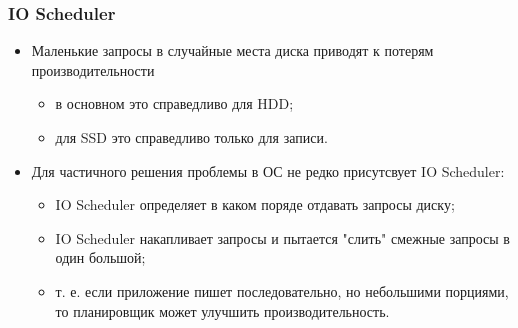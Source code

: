 \begin{frame}
\frametitle{IO Scheduler}
\begin{itemize}
  \item Маленькие запросы в случайные места диска приводят к потерям
  производительности
  \begin{itemize}
    \item в основном это справедливо для HDD;
    \item для SSD это справедливо только для записи.
  \end{itemize}
  \item Для частичного решения проблемы в ОС не редко присутсвует IO Scheduler:
  \begin{itemize}
    \item IO Scheduler определяет в каком поряде отдавать запросы диску;
    \item IO Scheduler накапливает запросы и пытается "слить" смежные запросы в 
    один большой;
    \item т. е. если приложение пишет последовательно, но небольшими порциями,
    то планировщик может улучшить производительность.
  \end{itemize}
\end{itemize}
\end{frame}
